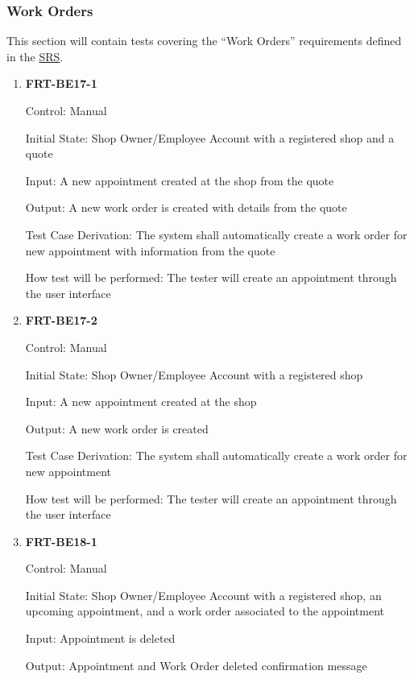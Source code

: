 \documentclass[12pt, titlepage]{article}
\begin{document}
\subsubsection{Work Orders}

This section will contain tests covering the ``Work Orders'' requirements defined in the
\href{https://github.com/arkinmodi/project-sayyara/blob/main/docs/SRS/SRS.pdf}{SRS}.

\begin{enumerate}

	\item \textbf{FRT-BE17-1}

	      Control: Manual

	      Initial State: Shop Owner/Employee Account with a registered shop and a quote

	      Input: A new appointment created at the shop from the quote

	      Output: A new work order is created with details from the quote

	      Test Case Derivation: The system shall automatically create a work order for new appointment with
	      information from the quote

	      How test will be performed: The tester will create an appointment through the user interface

	\item \textbf{FRT-BE17-2}

	      Control: Manual

	      Initial State: Shop Owner/Employee Account with a registered shop

	      Input: A new appointment created at the shop

	      Output: A new work order is created

	      Test Case Derivation: The system shall automatically create a work order for new appointment

	      How test will be performed: The tester will create an appointment through the user interface

	\item \textbf{FRT-BE18-1}

	      Control: Manual

	      Initial State: Shop Owner/Employee Account with a registered shop, an upcoming appointment, and a
	      work order associated to the appointment

	      Input: Appointment is deleted

	      Output: Appointment and Work Order deleted confirmation message


\end{enumerate}
\end{document}
